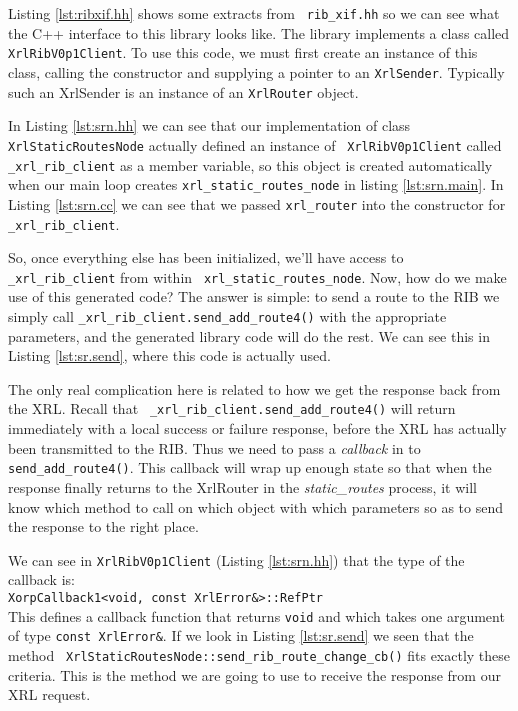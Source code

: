 \documentclass[11pt]{article}
\newcommand{\stt}{\tt\small}
\newcommand{\SRI}{{\it static\_routes}\xspace}
\begin{document}
Listing \ref{lst:ribxif.hh} shows some extracts from {\stt
rib\_xif.hh} so we can see what the C++ interface to this library
looks like.  The library implements a class called {\stt
XrlRibV0p1Client}.  To use this code, we must first create an instance
of this class, calling the constructor and supplying a pointer to an
{\stt XrlSender}.  Typically such an XrlSender is an instance of an
{\stt XrlRouter} object.  

In Listing \ref{lst:srn.hh} we can see that our implementation of class
{\stt XrlStaticRoutesNode} actually defined an instance of {\stt
XrlRibV0p1Client} called {\stt \_xrl\_rib\_client} as a member
variable, so this object is created automatically when our main loop
creates {\stt xrl\_static\_routes\_node} in listing
\ref{lst:srn.main}.  In Listing \ref{lst:srn.cc} we can see that we
passed {\stt xrl\_router} into the constructor for {\stt
\_xrl\_rib\_client}.

So, once everything else has been initialized, we'll have access
to {\stt \_xrl\_rib\_client} from within {\stt
xrl\_static\_routes\_node}.  Now, how do we make use of this generated
code?  The answer is simple: to send a route to the RIB we simply call
{\stt \_xrl\_rib\_client.send\_add\_route4()} with the appropriate
parameters, and the generated library code will do the rest.  We can
see this in Listing \ref{lst:sr.send}, where this code is actually used.

The only real complication here is related to how we get the response
back from the XRL.  Recall that {\stt
\_xrl\_rib\_client.send\_add\_route4()} will return immediately with a local
success or failure response, before the XRL has actually been
transmitted to the RIB.  Thus we need to pass a {\it callback} in to
{\stt send\_add\_route4()}.  This callback will wrap up enough state so
that when the response finally returns to the XrlRouter in the \SRI
process, it will know which method to call on which object with which
parameters so as to send the response to the right place.

We can see in {\stt XrlRibV0p1Client} (Listing \ref{lst:srn.hh}) that
the type of the callback is:\\
{\stt XorpCallback1<void, const XrlError\&>::RefPtr}\\
This defines a callback function that returns {\stt void} and which
takes one argument of type {\stt const XrlError\&}.  If we look in
Listing \ref{lst:sr.send} we seen that the method {\stt
XrlStaticRoutesNode::send\_rib\_route\_change\_cb()} fits exactly these
criteria.  This is the method we are going to use to receive the
response from our XRL request.
\end{document}

